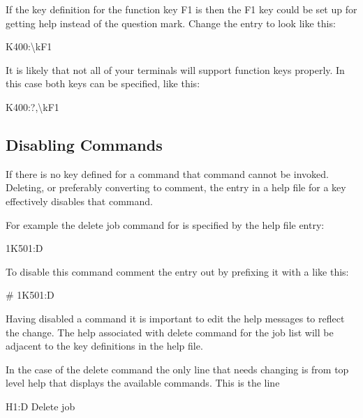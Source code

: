 If the key definition for the function key F1 is
 then the F1 key could be set
up for getting help instead of the question mark. Change the entry to
look like this:

\begin{expara}

K400:{\textbackslash}kF1

\end{expara}

It is likely that not all of your terminals will support function keys
properly. In this case both keys can be specified, like this:

\begin{expara}

K400:?,{\textbackslash}kF1

\end{expara}

\subsection{Disabling Commands}
If there is no key defined for a command that command cannot be invoked.
Deleting, or preferably converting to comment, the entry in a help file
for a key effectively disables that command.

For example the delete job command for \PrBtq{} is
specified by the help file entry:

\begin{expara}

1K501:D

\end{expara}

To disable this command comment the entry out by prefixing it with a
\exampletext{\#} like this:

\begin{expara}

\# 1K501:D

\end{expara}

Having disabled a command it is important to edit the help messages to
reflect the change. The help associated with delete command for the job
list will be adjacent to the key definitions in the help file.

In the case of the delete command the only line that needs changing is
from top level help that displays the available commands. This is the
line

\begin{expara}

H1:D Delete job

\end{expara}

